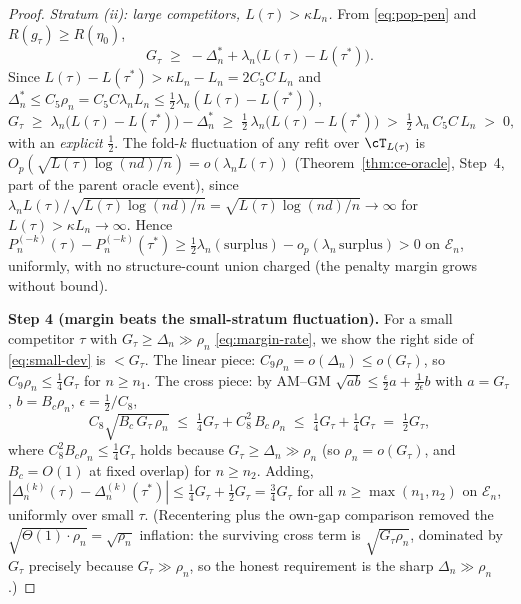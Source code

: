 \begin{proof}
\emph{Stratum (ii): large competitors, $L(\tau)>\kappa L_n$.} From
\eqref{eq:pop-pen} and $R(g_\tau)\ge R(\eta_0)$,
\begin{equation}\label{eq:large-margin}
  G_\tau \;\ge\; -\Delta^\ast_n+\lambda_n\bigl(L(\tau)-L(\tau^\ast)\bigr).
\end{equation}
Since $L(\tau)-L(\tau^\ast)>\kappa L_n-L_n=2C_5C\,L_n$ and $\Delta^\ast_n\le
C_5\rho_n=C_5C\lambda_n L_n\le\tfrac12\lambda_n(L(\tau)-L(\tau^\ast))$,
\begin{equation}\label{eq:large-dom}
  G_\tau
  \;\ge\; \lambda_n\bigl(L(\tau)-L(\tau^\ast)\bigr)-\Delta^\ast_n
  \;\ge\; \tfrac12\,\lambda_n\bigl(L(\tau)-L(\tau^\ast)\bigr)
  \;>\; \tfrac12\,\lambda_n\,C_5C\,L_n \;>\;0,
\end{equation}
with an \emph{explicit} $\tfrac12$. The fold-$k$ fluctuation of any refit over
$\cT_{L(\tau)}$ is $O_p(\sqrt{L(\tau)\log(nd)/n})=o(\lambda_n L(\tau))$
(Theorem~\ref{thm:ce-oracle}, Step~4, part of the parent oracle event), since
$\lambda_n L(\tau)/\sqrt{L(\tau)\log(nd)/n}=\sqrt{L(\tau)\log(nd)/n}\to\infty$ for
$L(\tau)>\kappa L_n\to\infty$. Hence
$P_n^{(-k)}(\tau)-P_n^{(-k)}(\tau^\ast)\ge\tfrac12\lambda_n(\text{surplus})
-o_p(\lambda_n\,\text{surplus})>0$ on $\mathcal{E}_n$, uniformly, with no
structure-count union charged (the penalty margin grows without bound).

\smallskip\noindent\textbf{Step 4 (margin beats the small-stratum fluctuation).}
For a small competitor $\tau$ with $G_\tau\ge\Delta_n\gg\rho_n$
\eqref{eq:margin-rate}, we show the right side of \eqref{eq:small-dev} is
$<G_\tau$. The linear piece: $C_9\rho_n=o(\Delta_n)\le o(G_\tau)$, so
$C_9\rho_n\le\tfrac14 G_\tau$ for $n\ge n_1$. The cross piece: by AM--GM
$\sqrt{ab}\le\tfrac{\epsilon}{2}a+\tfrac{1}{2\epsilon}b$ with $a=G_\tau$,
$b=B_c\rho_n$, $\epsilon=\tfrac12/C_8$,
\begin{equation}\label{eq:cross}
  C_8\sqrt{B_c\,G_\tau\,\rho_n}
  \;\le\; \tfrac14 G_\tau + C_8^2\,B_c\,\rho_n
  \;\le\; \tfrac14 G_\tau + \tfrac14 G_\tau
  \;=\; \tfrac12 G_\tau,
\end{equation}
where $C_8^2 B_c\rho_n\le\tfrac14 G_\tau$ holds because $G_\tau\ge\Delta_n\gg
\rho_n$ (so $\rho_n=o(G_\tau)$, and $B_c=O(1)$ at fixed overlap) for $n\ge n_2$.
Adding, $|\Delta_n^{(k)}(\tau)-\Delta_n^{(k)}(\tau^\ast)|\le\tfrac14 G_\tau+
\tfrac12 G_\tau=\tfrac34 G_\tau$ for all $n\ge\max(n_1,n_2)$ on $\mathcal{E}_n$,
uniformly over small $\tau$. (Recentering plus the own-gap comparison removed the
$\sqrt{\Theta(1)\cdot\rho_n}=\sqrt{\rho_n}$ inflation: the surviving cross term is
$\sqrt{G_\tau\rho_n}$, dominated by $G_\tau$ precisely because $G_\tau\gg\rho_n$,
so the honest requirement is the sharp $\Delta_n\gg\rho_n$.)


\end{proof}
